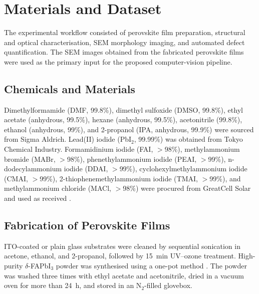 \documentclass[pdflatex,sn-mathphys-num,iicol]{sn-jnl}
\theoremstyle{thmstyleone}
\theoremstyle{thmstyletwo}
\theoremstyle{thmstylethree}
\begin{document}

\section{Materials and Dataset}\label{sec:materials_dataset}

The experimental workflow consisted of perovskite film preparation,
structural and optical characterisation, SEM morphology imaging, and
automated defect quantification. The SEM images obtained from the
fabricated perovskite films were used as the primary input for the
proposed computer-vision pipeline.

\subsection{Chemicals and Materials}\label{subsec:chemicals_materials}

Dimethylformamide (DMF, 99.8\%), dimethyl sulfoxide (DMSO, 99.8\%),
ethyl acetate (anhydrous, 99.5\%), hexane (anhydrous, 99.5\%),
acetonitrile (99.8\%), ethanol (anhydrous, 99\%), and 2-propanol
(IPA, anhydrous, 99.9\%) were sourced from Sigma Aldrich. Lead(II)
iodide (PbI$_2$, 99.99\%) was obtained from Tokyo Chemical Industry.
Formamidinium iodide (FAI, $>$98\%), methylammonium bromide (MABr,
$>$98\%), phenethylammonium iodide (PEAI, $>$99\%), n-dodecylammonium
iodide (DDAI, $>$99\%), cyclohexylmethylammonium iodide (CMAI,
$>$99\%), 2-thiophenemethylammonium iodide (TMAI, $>$99\%), and
methylammonium chloride (MACl, $>$98\%) were procured from GreatCell
Solar and used as received \cite{ref24}.

\subsection{Fabrication of Perovskite Films}\label{subsec:fabrication}

ITO-coated or plain glass substrates were cleaned by sequential
sonication in acetone, ethanol, and 2-propanol, followed by 15~min
UV--ozone treatment. High-purity $\delta$-FAPbI$_3$ powder was
synthesised using a one-pot method \cite{ref24}. The powder was
washed three times with ethyl acetate and acetonitrile, dried in a
vacuum oven for more than 24~h, and stored in an N$_2$-filled
glovebox.
\end{document}
